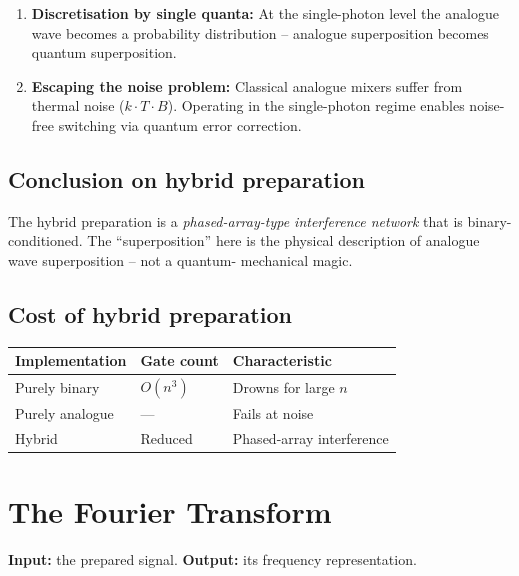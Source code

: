 \begin{enumerate}
  \item \textbf{Discretisation by single quanta:} At the single-photon
    level the analogue wave becomes a probability distribution --
    analogue superposition becomes quantum superposition.
  \item \textbf{Escaping the noise problem:} Classical analogue mixers
    suffer from thermal noise ($k \cdot T \cdot B$). Operating in the
    single-photon regime enables noise-free switching via quantum error
    correction.
\end{enumerate}

\subsection{Conclusion on hybrid preparation}

\begin{keyresult}[Hybrid preparation = binary-controlled interference network]
The hybrid preparation is a \emph{phased-array-type interference
network} that is binary-conditioned. The ``superposition'' here is the
physical description of analogue wave superposition -- not a quantum-
mechanical magic.
\end{keyresult}

\subsection{Cost of hybrid preparation}

\begin{center}
\begin{tabular}{lll}
\toprule
Implementation & Gate count & Characteristic \\
\midrule
Purely binary & $O(n^3)$ & Drowns for large $n$ \\
Purely analogue & --- & Fails at noise \\
Hybrid & Reduced & Phased-array interference \\
\bottomrule
\end{tabular}
\end{center}


\section{The Fourier Transform}
\label{sec:ft}

\textbf{Input:} the prepared signal.
\textbf{Output:} its frequency representation.

